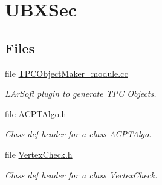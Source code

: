 \hypertarget{group__UBXSec}{\section{U\-B\-X\-Sec}
\label{group__UBXSec}
}
\subsection*{Files}
\begin{DoxyCompactItemize}
\item 
file \hyperlink{TPCObjectMaker__module_8cc}{T\-P\-C\-Object\-Maker\-\_\-module.\-cc}
\begin{DoxyCompactList}\small\item\em L\-Ar\-Soft plugin to generate T\-P\-C Objects. \end{DoxyCompactList}\item 
file \hyperlink{ACPTAlgo_8h}{A\-C\-P\-T\-Algo.\-h}
\begin{DoxyCompactList}\small\item\em Class def header for a class A\-C\-P\-T\-Algo. \end{DoxyCompactList}\item 
file \hyperlink{VertexCheck_8h}{Vertex\-Check.\-h}
\begin{DoxyCompactList}\small\item\em Class def header for a class Vertex\-Check. \end{DoxyCompactList}\end{DoxyCompactItemize}
